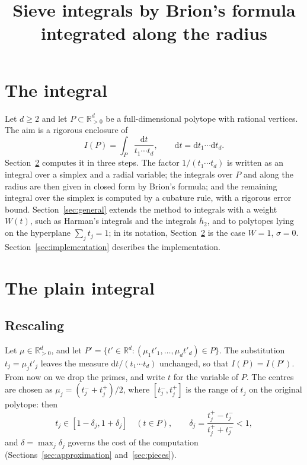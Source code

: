 \documentclass[11pt]{article}
\title{Sieve integrals by Brion's formula\\ integrated along the radius}
\author{}
\date{}
\theoremstyle{remark}
\newcommand{\R}{\mathbb{R}}
\newcommand{\dd}{\mathrm{d}}
\begin{document}
\maketitle

\section{The integral}

Let $d \geq 2$ and let $P \subset \R_{>0}^d$ be a full-dimensional polytope
with rational vertices. The aim is a rigorous enclosure of
\begin{equation}\label{eq:plain}
  I(P) = \int_P \frac{\dd t}{t_1 \cdots t_d},
  \qquad \dd t = \dd t_1 \cdots \dd t_d.
\end{equation}
Section~\ref{sec:plain} computes it in three steps. The factor $1/(t_1
\cdots t_d)$ is written as an integral over a simplex and a radial variable;
the integrals over $P$ and along the radius are then given in closed form by
Brion's formula; and the remaining integral over the simplex is computed by
a cubature rule, with a rigorous error bound. Section~\ref{sec:general}
extends the method to integrals with a weight $W(t)$, such as Harman's
integrals and the integrals $\bar h_2$, and to polytopes lying on the
hyperplane $\sum_j t_j = 1$; in its notation, Section~\ref{sec:plain} is the
case $W = 1$, $\sigma = 0$. Section~\ref{sec:implementation} describes the
implementation.

\section{The plain integral}
\label{sec:plain}

\subsection{Rescaling}
\label{sec:rescaling}

Let $\mu \in \R_{>0}^d$, and let $P' = \{ t' \in \R^d : (\mu_1 t'_1, \ldots,
\mu_d t'_d) \in P \}$. The substitution $t_j = \mu_j t'_j$ leaves the
measure $\dd t / (t_1 \cdots t_d)$ unchanged, so that $I(P) = I(P')$. From
now on we drop the primes, and write $t$ for the variable of $P$. The
centres are chosen as $\mu_j = (t_j^{-} + t_j^{+})/2$, where $[t_j^{-},
t_j^{+}]$ is the range of $t_j$ on the original polytope: then
\begin{equation}\label{eq:delta}
  t_j \in [1 - \delta_j, 1 + \delta_j] \quad (t \in P),
  \qquad \delta_j = \frac{t_j^{+} - t_j^{-}}{t_j^{+} + t_j^{-}} < 1,
\end{equation}
and $\delta = \max_j \delta_j$ governs the cost of the computation
(Sections~\ref{sec:approximation} and~\ref{sec:pieces}).
\end{document}
